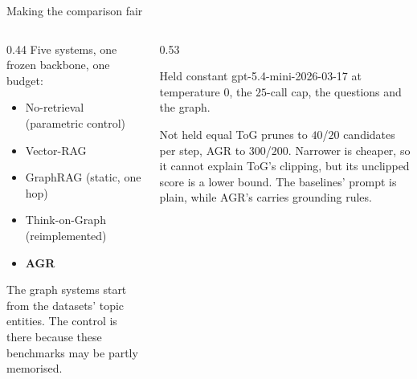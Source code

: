 %
\begin{frame}{Making the comparison fair}
  \begin{columns}[T]
    \begin{column}{0.44\textwidth}
      \small\let\raggedright\agrraggedright\agrraggedright
      Five systems, \alert{one frozen backbone}, \alert{one budget}:
      \begin{itemize}\setlength{\itemsep}{0pt}\setlength{\parskip}{0pt}
        \item No-retrieval (parametric control)
        \item Vector-RAG
        \item GraphRAG (static, one hop)
        \item Think-on-Graph (reimplemented)
        \item \textbf{AGR}
      \end{itemize}
      The graph systems start from the datasets' topic entities. The
      control is there because these benchmarks may be partly
      \alert{memorised}.
    \end{column}
    \begin{column}{0.53\textwidth}
      \begin{block}{Held constant}
        \small\agrraggedright
        \textsf{gpt-5.4-mini-2026-03-17} at temperature $0$, the $25$-call
        cap, the questions and the graph.
      \end{block}
      \vspace{1mm}
      \begin{block}{\alert{Not} held equal}
        \small\agrraggedright
        ToG prunes to $40$/$20$ candidates per step, AGR to $300$/$200$.
        \alert{Narrower is cheaper}, so it cannot explain ToG's clipping,
        but its unclipped score is a \alert{lower bound}. The baselines'
        prompt is plain, while AGR's carries grounding rules.
      \end{block}
    \end{column}
  \end{columns}
\end{frame}

